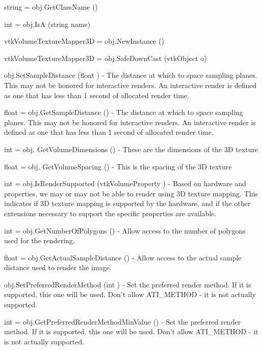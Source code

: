 \begin{DoxyItemize}
\item {\ttfamily string = obj.\-Get\-Class\-Name ()}  
\item {\ttfamily int = obj.\-Is\-A (string name)}  
\item {\ttfamily vtk\-Volume\-Texture\-Mapper3\-D = obj.\-New\-Instance ()}  
\item {\ttfamily vtk\-Volume\-Texture\-Mapper3\-D = obj.\-Safe\-Down\-Cast (vtk\-Object o)}  
\item {\ttfamily obj.\-Set\-Sample\-Distance (float )} -\/ The distance at which to space sampling planes. This may not be honored for interactive renders. An interactive render is defined as one that has less than 1 second of allocated render time.  
\item {\ttfamily float = obj.\-Get\-Sample\-Distance ()} -\/ The distance at which to space sampling planes. This may not be honored for interactive renders. An interactive render is defined as one that has less than 1 second of allocated render time.  
\item {\ttfamily int = obj. Get\-Volume\-Dimensions ()} -\/ These are the dimensions of the 3\-D texture  
\item {\ttfamily float = obj. Get\-Volume\-Spacing ()} -\/ This is the spacing of the 3\-D texture  
\item {\ttfamily int = obj.\-Is\-Render\-Supported (vtk\-Volume\-Property )} -\/ Based on hardware and properties, we may or may not be able to render using 3\-D texture mapping. This indicates if 3\-D texture mapping is supported by the hardware, and if the other extensions necessary to support the specific properties are available.  
\item {\ttfamily int = obj.\-Get\-Number\-Of\-Polygons ()} -\/ Allow access to the number of polygons used for the rendering.  
\item {\ttfamily float = obj.\-Get\-Actual\-Sample\-Distance ()} -\/ Allow access to the actual sample distance used to render the image.  
\item {\ttfamily obj.\-Set\-Preferred\-Render\-Method (int )} -\/ Set the preferred render method. If it is supported, this one will be used. Don't allow A\-T\-I\-\_\-\-M\-E\-T\-H\-O\-D -\/ it is not actually supported.  
\item {\ttfamily int = obj.\-Get\-Preferred\-Render\-Method\-Min\-Value ()} -\/ Set the preferred render method. If it is supported, this one will be used. Don't allow A\-T\-I\-\_\-\-M\-E\-T\-H\-O\-D -\/ it is not actually supported.  

\end{DoxyItemize}
